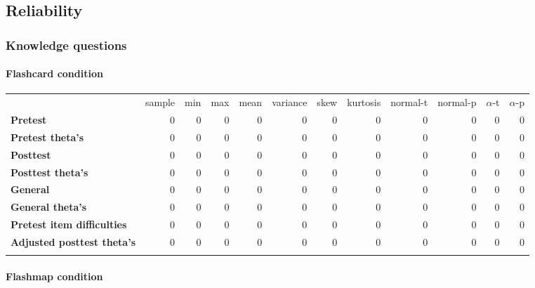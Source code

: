 \subsection{\textbf{Reliability}}\label{reliability}

\subsubsection{Knowledge questions}\label{knowledge-questions}

\paragraph{Flashcard condition}\label{flashcard-condition}

\begin{longtable}[c]{@{}lrrrrrrrrrrr@{}}
\toprule\addlinespace
& sample & min & max & mean & variance & skew & kurtosis & normal-t &
normal-p & $\alpha$-t & $\alpha$-p
\\\addlinespace
\midrule\endhead
\textbf{Pretest} & 0 & 0 & 0 & 0 & 0 & 0 & 0 & 0 & 0 & 0 & 0
\\\addlinespace
\textbf{Pretest theta's} & 0 & 0 & 0 & 0 & 0 & 0 & 0 & 0 & 0 & 0 & 0
\\\addlinespace
\textbf{Posttest} & 0 & 0 & 0 & 0 & 0 & 0 & 0 & 0 & 0 & 0 & 0
\\\addlinespace
\textbf{Posttest theta's} & 0 & 0 & 0 & 0 & 0 & 0 & 0 & 0 & 0 & 0 & 0
\\\addlinespace
\textbf{General} & 0 & 0 & 0 & 0 & 0 & 0 & 0 & 0 & 0 & 0 & 0
\\\addlinespace
\textbf{General theta's} & 0 & 0 & 0 & 0 & 0 & 0 & 0 & 0 & 0 & 0 & 0
\\\addlinespace
\textbf{Pretest item difficulties} & 0 & 0 & 0 & 0 & 0 & 0 & 0 & 0 & 0 &
0 & 0
\\\addlinespace
\textbf{Adjusted posttest theta's} & 0 & 0 & 0 & 0 & 0 & 0 & 0 & 0 & 0 &
0 & 0
\\\addlinespace
\bottomrule
\end{longtable}

\paragraph{Flashmap condition}\label{flashmap-condition}

